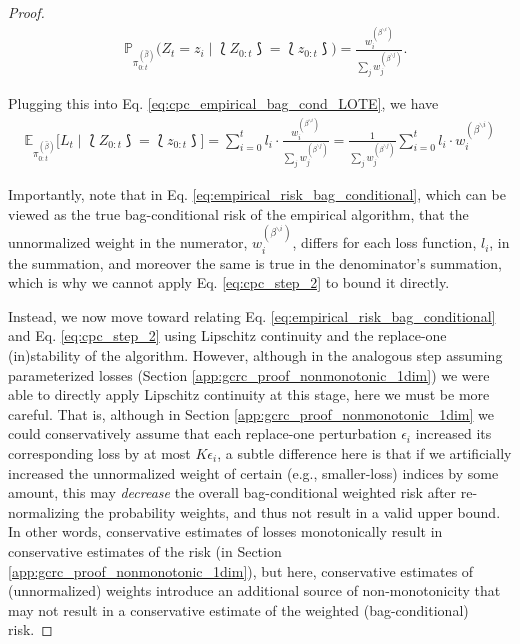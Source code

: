 \begin{proof}
\begin{align}
    & \mathbb{P}_{\pi_{0:t}^{(\hat\beta)}}\big(Z_{t}=z_i \mid \lbag Z_{0:t} \rbag = \lbag z_{0:t} \rbag\big)  = \frac{w_i^{(\beta^{\backslash i})}}{\sum_{j}w_j^{(\beta^{\backslash j})}}.
\end{align}

Plugging this into Eq. \eqref{eq:cpc_empirical_bag_cond_LOTE}, we have
\begin{align}\label{eq:empirical_risk_bag_conditional}
    \mathbb{E}_{\pi_{0:t}^{(\hat\beta)}}\Big[L_{t} \mid \lbag Z_{0:t} \rbag = \lbag z_{0:t} \rbag\Big] = 
    \sum_{i=0}^{t}l_i\cdot \frac{w_i^{(\beta^{\backslash i})}}{\sum_{j}w_j^{(\beta^{\backslash j})}} = \frac{1}{\sum_{j}w_j^{(\beta^{\backslash j})}}\sum_{i=0}^{t}l_i\cdot w_i^{(\beta^{\backslash i})}
\end{align}


Importantly, note that in Eq. \eqref{eq:empirical_risk_bag_conditional}, which can be viewed as the true bag-conditional risk of the empirical algorithm, that the
unnormalized weight in the numerator, $w_i^{(\beta^{\backslash i})}$, differs for each loss function, $l_i$, in the summation, and moreover the same is true in the denominator's summation, 
which is why we cannot apply Eq. \eqref{eq:cpc_step_2} to bound it directly. 


Instead, we now move toward relating Eq. \eqref{eq:empirical_risk_bag_conditional} and Eq. \eqref{eq:cpc_step_2} using Lipschitz continuity and the replace-one (in)stability of the algorithm. However, although in the analogous step assuming  parameterized losses (Section \ref{app:gcrc_proof_nonmonotonic_1dim}) we were able to directly apply Lipschitz continuity at this stage, here we must be more careful. That is, although in Section \ref{app:gcrc_proof_nonmonotonic_1dim} we could conservatively assume that each replace-one perturbation $\epsilon_i$ increased its corresponding loss by at most $K\epsilon_i$, a subtle difference here is that if we artificially increased
the unnormalized weight of certain (e.g., smaller-loss) indices by some amount, this may \textit{decrease} the overall bag-conditional weighted risk after re-normalizing the probability weights, and thus not result in a valid upper bound. In other words, conservative estimates of losses monotonically result in conservative estimates of the risk (in Section \ref{app:gcrc_proof_nonmonotonic_1dim}), but here, conservative estimates of (unnormalized) weights introduce an additional source of non-monotonicity that may not result in a conservative estimate of the weighted (bag-conditional) risk.







\end{proof}
